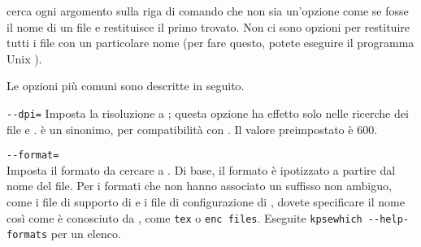 \documentclass{article}
\begin{document}
\KPS{} cerca ogni argomento sulla riga di comando che non sia un'opzione
come se fosse il nome di un file e restituisce il primo trovato. Non ci
sono opzioni per restituire tutti i file con un particolare nome (per fare
questo, potete eseguire il programma Unix ).

Le opzioni più comuni sono descritte in seguito.

\begin{ttdescription}
\item[\texttt{-{}-dpi=\var{num}}]\mbox{}
  Imposta la risoluzione a ; questa opzione ha effetto solo
  nelle ricerche dei file  e .  è un sinonimo,
  per compatibilità con . Il valore preimpostato è 600.

\item[\texttt{-{}-format=\var{nome}}]\mbox{}\\
  Imposta il formato da cercare a . Di base, il formato è
  ipotizzato a partire dal nome del file. Per i formati che non hanno
  associato un suffisso non ambiguo, come i file di supporto di \MP{} e i
  file di configurazione di , dovete specificare il nome
  così come è conosciuto da \KPS{}, come \texttt{tex} o \texttt{enc
  files}. Eseguite \texttt{kpsewhich -{}-help-formats} per un elenco.


\end{ttdescription}
\end{document}
